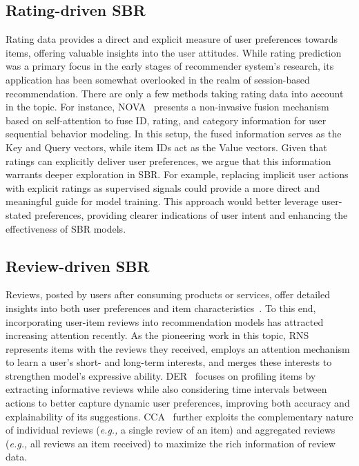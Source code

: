 \documentclass[lettersize,journal]{IEEEtran}
\newcommand{\eg}{\emph{e.g.,}\xspace}
\begin{document}
\subsection{Rating-driven SBR}\label{ratingsbr}
Rating data provides a direct and explicit measure of user preferences towards items, offering valuable insights into the user attitudes. While rating prediction was a primary focus in the early stages of recommender system's research, its application has been somewhat overlooked in the realm of session-based recommendation. There are only a few methods taking rating data into account in the topic. For instance, NOVA~\cite{liu@AAAI2021} presents a non-invasive fusion mechanism based on self-attention to fuse ID, rating, and category information for user sequential behavior modeling. In this setup, the fused information serves as the Key and Query vectors, while item IDs act as the Value vectors. Given that ratings can explicitly deliver user preferences, we argue that this information warrants deeper exploration in SBR. For example, replacing implicit user actions with explicit ratings as supervised signals could provide a more direct and meaningful guide for model training. This approach would better leverage user-stated preferences, providing clearer indications of user intent and enhancing the effectiveness of SBR models.


\subsection{Review-driven SBR}\label{reviewsbr}
Reviews, posted by users after consuming products or services, offer detailed insights into both user preferences and item characteristics~\cite{FineRec}. To this end, incorporating user-item reviews into recommendation models has attracted increasing attention recently. As the pioneering work in this topic, RNS~\cite{RNS} represents items with the reviews they received, employs an attention mechanism to learn a user's short- and long-term interests, and merges these interests to strengthen model’s expressive ability. DER~\cite{Chen@AAAI2019} focuses on profiling items by extracting informative reviews while also considering time intervals between actions to better capture dynamic user preferences, improving both accuracy and explainability of its suggestions. CCA~\cite{Huang@ICDM2023} further exploits the complementary nature of individual reviews (\eg a single review of an item) and aggregated reviews (\eg all reviews an item received) to maximize the rich information of review data. 
\end{document}
